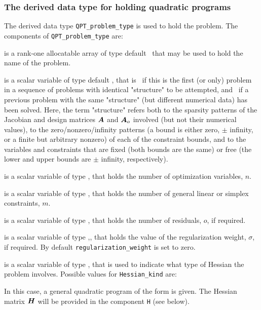 \documentclass{galahad}
\newcommand{\packagename}{QPT}
\begin{document}

\subsubsection{The derived data type for holding quadratic programs}
\label{typeprob}

The derived data type
{\tt \packagename\_problem\_type}
is used to hold the problem.
The components of
{\tt \packagename\_problem\_type}
are:

\begin{description}

 is a rank-one allocatable array of type default \character\, that
may be used to hold the name of the problem.

 is a scalar variable of type default \logical,
 that is \true\ if this is the first (or only) problem in a sequence of
 problems with identical "structure" to be attempted, and \false\ if
 a previous problem with the same "structure" (but different
 numerical data) has been solved. Here, the term "structure" refers both to
 the sparsity patterns of the Jacobian and design matrices ${\bm{A}}$ and
 ${\bm{A}}_o$ involved
 (but not their numerical values), to the zero/nonzero/infinity patterns
 (a bound is either zero, $\pm$ infinity, or a finite but arbitrary
 nonzero) of each of the constraint bounds, and to the variables and constraints
 that are fixed (both bounds are the same) or free (the lower and upper
 bounds are $\pm$ infinity, respectively).

 is a scalar variable of type \integer,
 that holds the number of optimization variables, $n$.

 is a scalar variable of type \integer,
 that holds the number of general linear or simplex constraints, $m$.

 is a scalar variable of type \integer,
 that holds the number of residuals, $o$, if required.

 is a scalar variable of type \realdp,,
 that holds the value of the regularization weight, $\sigma$, if required.
 By default {\tt regularization\_weight} is set to zero.

 is a scalar variable of type \integer,
that is used to indicate what type of Hessian the problem involves.
Possible values for {\tt Hessian\_kind} are:

\begin{description}
  In this case, a general quadratic program of the form
 is given. The Hessian matrix ${\bm{H}}$ will be provided in the
component {\tt H} (see below).


\end{description}
\end{description}
\end{document}
